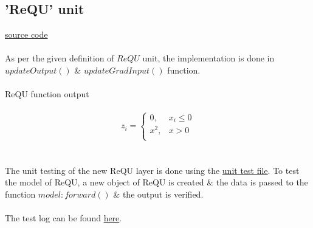 \documentclass{article}
\begin{document}
	\subsection{'ReQU' unit}
	\href{./ReQUlayer/requ.lua}{source code}
	\\\\
	As per the given definition of $ReQU$ unit, the implementation is done in
	$updateOutput()$ \& $updateGradInput()$ function.\\\\
	ReQU function output\\\\
	\begin{equation*}
	 z_{i} =  \begin{cases} 
					0, & x_{i}\leq 0 \\
					x^{2}, & x > 0 \\
			  \end{cases}
	\end{equation*}
	\\\\
	The unit testing of the new ReQU layer is done
	using the \href{./ReQUlayer/requTest.lua}{unit test file}. To test the
	model of ReQU, a new object of ReQU is created \& the data is passed to the
	function $model:forward()$ \& the output is verified.\\\\
	The test log can be found
	\href{./ReQUlayer/requTest.log}{here}.
\end{document}
